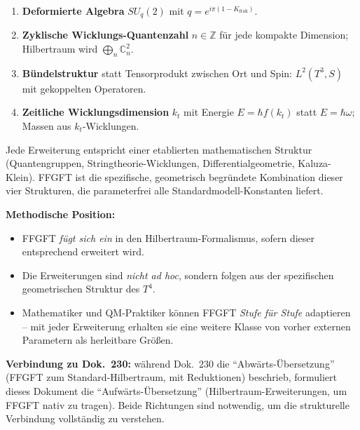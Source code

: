 \begin{enumerate}[leftmargin=2em,itemsep=2pt,topsep=2pt]
  \item \textbf{Deformierte Algebra} $SU_q(2)$ mit
        $q = e^{i\pi(1-K_{\text{frak}})}$.
  \item \textbf{Zyklische Wicklungs-Quantenzahl} $n \in \mathbb{Z}$ für jede
        kompakte Dimension; Hilbertraum wird
        $\bigoplus_n \mathbb{C}^2_n$.
  \item \textbf{Bündelstruktur} statt Tensorprodukt zwischen Ort und
        Spin: $L^2(T^3, S)$ mit gekoppelten Operatoren.
  \item \textbf{Zeitliche Wicklungsdimension} $k_t$ mit Energie
        $E = \hbar f(k_t)$ statt $E = \hbar\omega$; Massen aus
        $k_t$-Wicklungen.
\end{enumerate}

Jede Erweiterung entspricht einer etablierten mathematischen
Struktur (Quantengruppen, Stringtheorie-Wicklungen, Differentialgeometrie,
Kaluza-Klein). FFGFT ist die spezifische, geometrisch begründete
Kombination dieser vier Strukturen, die parameterfrei alle
Standardmodell-Konstanten liefert.

\textbf{Methodische Position:}
\begin{itemize}[leftmargin=2em,itemsep=2pt,topsep=2pt]
  \item FFGFT \emph{fügt sich ein} in den Hilbertraum-Formalismus,
        sofern dieser entsprechend erweitert wird.
  \item Die Erweiterungen sind \emph{nicht ad hoc}, sondern folgen
        aus der spezifischen geometrischen Struktur des $T^4$.
  \item Mathematiker und QM-Praktiker können FFGFT \emph{Stufe für
        Stufe} adaptieren -- mit jeder Erweiterung erhalten sie eine
        weitere Klasse von vorher externen Parametern als
        herleitbare Größen.
\end{itemize}

\textbf{Verbindung zu Dok.~230:} während Dok.~230 die
\enquote{Abwärts-Übersetzung} (FFGFT zum Standard-Hilbertraum, mit
Reduktionen) beschrieb, formuliert dieses Dokument die
\enquote{Aufwärts-Übersetzung} (Hilbertraum-Erweiterungen, um FFGFT
nativ zu tragen). Beide Richtungen sind notwendig, um die
strukturelle Verbindung vollständig zu verstehen.
